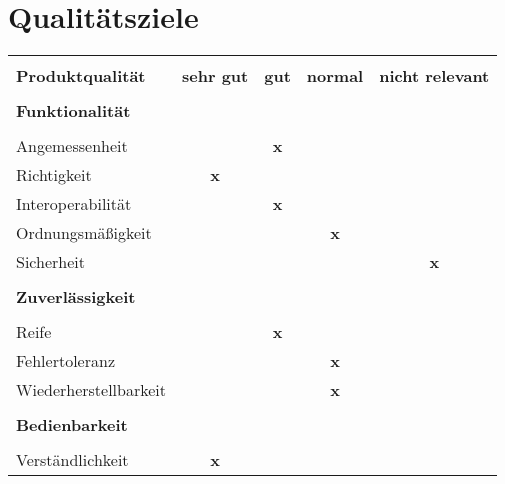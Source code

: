 \section{Qualitätsziele}

\begin{table}[H]
\centering

\label{tabelle_qualitaetsziele}
\begin{tabular}{|lcccc|}
\hline 
\rowcolor[RGB]{191,191,255} &&&& \\[-0.35cm]
\rowcolor[RGB]{191,191,255}
\textbf{Produktqualität}       & \textbf{sehr gut} & \textbf{gut} & \textbf{normal} & \textbf{nicht relevant} \\[0.1cm]
\hline 
\rowcolor[RGB]{230,230,230}&&&& \\[-0.35cm] 
\rowcolor[RGB]{230,230,230}\textbf{Funktionalität} &&&&   				  \\[0.1cm] 
\hline &&&& \\[-0.4cm]
Angemessenheit        &          & \textbf{x}   &        &                \\[0.1cm]
Richtigkeit           & \textbf{x}        &     &        &                \\[0.1cm]
Interoperabilität     &          & \textbf{x}   &        &                \\[0.1cm]
Ordnungsmäßigkeit     &          &     & \textbf{x}      &                \\[0.1cm]
Sicherheit            &          &     &        & \textbf{x}              \\[0.1cm]
\rowcolor[RGB]{230,230,230}\hline &&&& \\[-0.35cm]
\rowcolor[RGB]{230,230,230}\textbf{Zuverlässigkeit} &&&&       							 		  \\[0.1cm] 
\hline &&&& \\[-0.4cm]
Reife                 &          & \textbf{x}   &        &                \\[0.1cm]
Fehlertoleranz        &          &     & \textbf{x}      &                \\[0.1cm]
Wiederherstellbarkeit &          &     & \textbf{x}      &                \\[0.1cm] 
\rowcolor[RGB]{230,230,230}\hline &&&& \\[-0.35cm]
\rowcolor[RGB]{230,230,230}\textbf{Bedienbarkeit}&&&&								         		  \\[0.1cm] 
\hline &&&& \\[-0.4cm]
Verständlichkeit      & \textbf{x}        &     &        &                \\[0.1cm]

\end{tabular}
\end{table}
